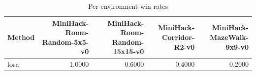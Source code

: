 \begin{table}[htbp]
\centering
\caption{Per-environment win rates}
\label{tab:per-env}
\begin{tabular}{lrrrr}
\toprule
\textbf{Method} & \textbf{MiniHack-Room-Random-5x5-v0} & \textbf{MiniHack-Room-Random-15x15-v0} & \textbf{MiniHack-Corridor-R2-v0} & \textbf{MiniHack-MazeWalk-9x9-v0} \\
\midrule
lora & 1.0000 & 0.6000 & 0.4000 & 0.2000 \\
\bottomrule
\end{tabular}
\end{table}